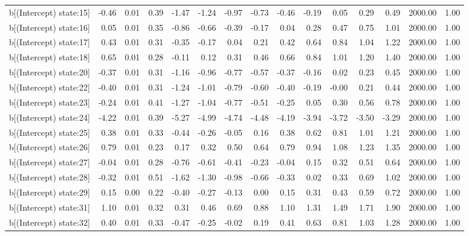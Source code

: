 \begin{table}[ht]
\begin{tabular}{rrrrrrrrrrrrrrr}
  b[(Intercept) state:15] & -0.46 & 0.01 & 0.39 & -1.47 & -1.24 & -0.97 & -0.73 & -0.46 & -0.19 & 0.05 & 0.29 & 0.49 & 2000.00 & 1.00 \\ 
  b[(Intercept) state:16] & 0.05 & 0.01 & 0.35 & -0.86 & -0.66 & -0.39 & -0.17 & 0.04 & 0.28 & 0.47 & 0.75 & 1.01 & 2000.00 & 1.00 \\ 
  b[(Intercept) state:17] & 0.43 & 0.01 & 0.31 & -0.35 & -0.17 & 0.04 & 0.21 & 0.42 & 0.64 & 0.84 & 1.04 & 1.22 & 2000.00 & 1.00 \\ 
  b[(Intercept) state:18] & 0.65 & 0.01 & 0.28 & -0.11 & 0.12 & 0.31 & 0.46 & 0.66 & 0.84 & 1.01 & 1.20 & 1.40 & 2000.00 & 1.00 \\ 
  b[(Intercept) state:20] & -0.37 & 0.01 & 0.31 & -1.16 & -0.96 & -0.77 & -0.57 & -0.37 & -0.16 & 0.02 & 0.23 & 0.45 & 2000.00 & 1.00 \\ 
  b[(Intercept) state:22] & -0.40 & 0.01 & 0.31 & -1.24 & -1.01 & -0.79 & -0.60 & -0.40 & -0.19 & -0.00 & 0.21 & 0.44 & 2000.00 & 1.00 \\ 
  b[(Intercept) state:23] & -0.24 & 0.01 & 0.41 & -1.27 & -1.04 & -0.77 & -0.51 & -0.25 & 0.05 & 0.30 & 0.56 & 0.78 & 2000.00 & 1.00 \\ 
  b[(Intercept) state:24] & -4.22 & 0.01 & 0.39 & -5.27 & -4.99 & -4.74 & -4.48 & -4.19 & -3.94 & -3.72 & -3.50 & -3.29 & 2000.00 & 1.00 \\ 
  b[(Intercept) state:25] & 0.38 & 0.01 & 0.33 & -0.44 & -0.26 & -0.05 & 0.16 & 0.38 & 0.62 & 0.81 & 1.01 & 1.21 & 2000.00 & 1.00 \\ 
  b[(Intercept) state:26] & 0.79 & 0.01 & 0.23 & 0.17 & 0.32 & 0.50 & 0.64 & 0.79 & 0.94 & 1.08 & 1.23 & 1.35 & 2000.00 & 1.00 \\ 
  b[(Intercept) state:27] & -0.04 & 0.01 & 0.28 & -0.76 & -0.61 & -0.41 & -0.23 & -0.04 & 0.15 & 0.32 & 0.51 & 0.64 & 2000.00 & 1.00 \\ 
  b[(Intercept) state:28] & -0.32 & 0.01 & 0.51 & -1.62 & -1.30 & -0.98 & -0.66 & -0.33 & 0.02 & 0.33 & 0.69 & 1.02 & 2000.00 & 1.00 \\ 
  b[(Intercept) state:29] & 0.15 & 0.00 & 0.22 & -0.40 & -0.27 & -0.13 & 0.00 & 0.15 & 0.31 & 0.43 & 0.59 & 0.72 & 2000.00 & 1.00 \\ 
  b[(Intercept) state:31] & 1.10 & 0.01 & 0.32 & 0.31 & 0.46 & 0.69 & 0.88 & 1.10 & 1.31 & 1.49 & 1.71 & 1.90 & 2000.00 & 1.00 \\ 
  b[(Intercept) state:32] & 0.40 & 0.01 & 0.33 & -0.47 & -0.25 & -0.02 & 0.19 & 0.41 & 0.63 & 0.81 & 1.03 & 1.28 & 2000.00 & 1.00 \\ 

\end{tabular}
\end{table}
